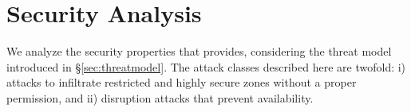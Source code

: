 \chapter{Security Analysis}
\label{analysis}




We analyze the security properties that \name provides, considering the threat model
introduced in \S\ref{sec:threatmodel}. The attack classes described here are twofold:
i) attacks to infiltrate restricted and highly secure zones without a proper permission,
and ii) disruption attacks that prevent availability.



